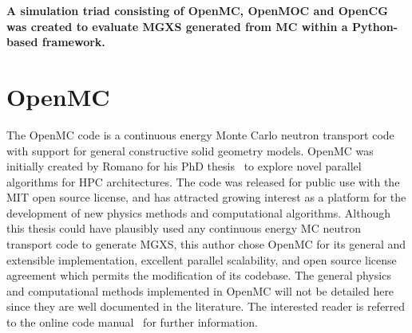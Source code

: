   

\begin{emphbox}
\textbf{A simulation triad consisting of OpenMC, OpenMOC and OpenCG was created to evaluate \ac{MGXS} generated from \ac{MC} within a Python-based framework.}
\end{emphbox}


\section{OpenMC}
\label{sec:chap4-openmc}

The OpenMC code is a continuous energy Monte Carlo neutron transport code~\cite{romano2013openmc} with support for general constructive solid geometry models. OpenMC was initially created by Romano for his PhD thesis~\cite{romano2013parallel} to explore novel parallel algorithms for \ac{HPC} architectures. The code was released for public use with the MIT open source license, and has attracted growing interest as a platform for the development of new physics methods and computational algorithms. Although this thesis could have plausibly used any continuous energy \ac{MC} neutron transport code to generate \ac{MGXS}, this author chose OpenMC for its general and extensible implementation, excellent parallel scalability, and open source license agreement which permits the modification of its codebase. The general physics and computational methods implemented in OpenMC will not be detailed here since they are well documented in the literature. The interested reader is referred to the online code manual~\cite{openmc2016manual} for further information.

